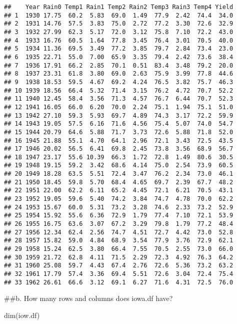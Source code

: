 \documentclass[
]{article}
\newenvironment{Shaded}{\begin{snugshade}}{\end{snugshade}}
\newcommand{\FunctionTok}[1]{\textcolor[rgb]{0.00,0.00,0.00}{#1}}
\newcommand{\NormalTok}[1]{#1}
\begin{document}
\begin{verbatim}
##    Year Rain0 Temp1 Rain1 Temp2 Rain2 Temp3 Rain3 Temp4 Yield
## 1  1930 17.75  60.2  5.83  69.0  1.49  77.9  2.42  74.4  34.0
## 2  1931 14.76  57.5  3.83  75.0  2.72  77.2  3.30  72.6  32.9
## 3  1932 27.99  62.3  5.17  72.0  3.12  75.8  7.10  72.2  43.0
## 4  1933 16.76  60.5  1.64  77.8  3.45  76.4  3.01  70.5  40.0
## 5  1934 11.36  69.5  3.49  77.2  3.85  79.7  2.84  73.4  23.0
## 6  1935 22.71  55.0  7.00  65.9  3.35  79.4  2.42  73.6  38.4
## 7  1936 17.91  66.2  2.85  70.1  0.51  83.4  3.48  79.2  20.0
## 8  1937 23.31  61.8  3.80  69.0  2.63  75.9  3.99  77.8  44.6
## 9  1938 18.53  59.5  4.67  69.2  4.24  76.5  3.82  75.7  46.3
## 10 1939 18.56  66.4  5.32  71.4  3.15  76.2  4.72  70.7  52.2
## 11 1940 12.45  58.4  3.56  71.3  4.57  76.7  6.44  70.7  52.3
## 12 1941 16.05  66.0  6.20  70.0  2.24  75.1  1.94  75.1  51.0
## 13 1942 27.10  59.3  5.93  69.7  4.89  74.3  3.17  72.2  59.9
## 14 1943 19.05  57.5  6.16  71.6  4.56  75.4  5.07  74.0  54.7
## 15 1944 20.79  64.6  5.88  71.7  3.73  72.6  5.88  71.8  52.0
## 16 1945 21.88  55.1  4.70  64.1  2.96  72.1  3.43  72.5  43.5
## 17 1946 20.02  56.5  6.41  69.8  2.45  73.8  3.56  68.9  56.7
## 18 1947 23.17  55.6 10.39  66.3  1.72  72.8  1.49  80.6  30.5
## 19 1948 19.15  59.2  3.42  68.6  4.14  75.0  2.54  73.9  60.5
## 20 1949 18.28  63.5  5.51  72.4  3.47  76.2  2.34  73.0  46.1
## 21 1950 18.45  59.8  5.70  68.4  4.65  69.7  2.39  67.7  48.2
## 22 1951 22.00  62.2  6.11  65.2  4.45  72.1  6.21  70.5  43.1
## 23 1952 19.05  59.6  5.40  74.2  3.84  74.7  4.78  70.0  62.2
## 24 1953 15.67  60.0  5.31  73.2  3.28  74.6  2.33  73.2  52.9
## 25 1954 15.92  55.6  6.36  72.9  1.79  77.4  7.10  72.1  53.9
## 26 1955 16.75  63.6  3.07  67.2  3.29  79.8  1.79  77.2  48.4
## 27 1956 12.34  62.4  2.56  74.7  4.51  72.7  4.42  73.0  52.8
## 28 1957 15.82  59.0  4.84  68.9  3.54  77.9  3.76  72.9  62.1
## 29 1958 15.24  62.5  3.80  66.4  7.55  70.5  2.55  73.0  66.0
## 30 1959 21.72  62.8  4.11  71.5  2.29  72.3  4.92  76.3  64.2
## 31 1960 25.08  59.7  4.43  67.4  2.76  72.6  5.36  73.2  63.2
## 32 1961 17.79  57.4  3.36  69.4  5.51  72.6  3.04  72.4  75.4
## 33 1962 26.61  66.6  3.12  69.1  6.27  71.6  4.31  72.5  76.0
\end{verbatim}

\#\#b. How many rows and columns does iowa.df have?

\begin{Shaded}
\begin{Highlighting}[]
\FunctionTok{dim}\NormalTok{(iow.df)}
\end{Highlighting}
\end{Shaded}
\end{document}
